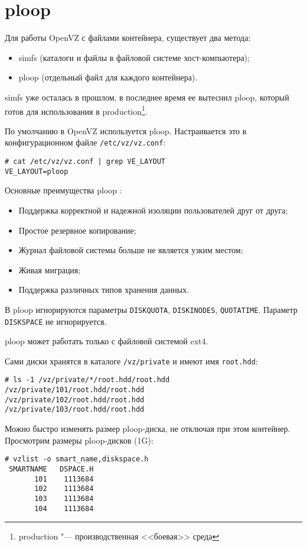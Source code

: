 \section{ploop}

Для работы OpenVZ с файлами контейнера, существует два метода:
\begin{itemize}
    \item simfs (каталоги и файлы в файловой системе хост-компьютера);
    \item ploop (отдельный файл для каждого контейнера).
\end{itemize}

simfs уже осталась в прошлом, в последнее время ее вытеснил ploop, который готов для использования в production\footnote{production "--- производственная <<боевая>> среда}.

По умолчанию в OpenVZ используется ploop.
Настраивается это в конфигурационном файле \texttt{/etc/vz/vz.conf}:
\begin{lstlisting}
# cat /etc/vz/vz.conf | grep VE_LAYOUT
VE_LAYOUT=ploop
\end{lstlisting}

Основные преимущества ploop \cite{ploop}:
\begin{itemize}
    \item Поддержка корректной и надежной изоляции пользователей друг от друга;
    \item Простое резервное копирование;
    \item Журнал файловой системы больше не является узким местом;
    \item Живая миграция;
    \item Поддержка различных типов хранения данных.
\end{itemize}

В ploop игнорируются параметры \texttt{DISKQUOTA}, \texttt{DISKINODES}, \texttt{QUOTATIME}.
Параметр \texttt{DISKSPACE} не игнорируется.

ploop может работать только с файловой системой ext4.

Сами диски хранятся в каталоге \texttt{/vz/private} и имеют имя \texttt{root.hdd}:
\begin{lstlisting}
# ls -1 /vz/private/*/root.hdd/root.hdd
/vz/private/101/root.hdd/root.hdd
/vz/private/102/root.hdd/root.hdd
/vz/private/103/root.hdd/root.hdd
\end{lstlisting}

Можно быстро изменять размер ploop-диска, не отключая при этом контейнер.
Просмотрим размеры ploop-дисков (1G):
\begin{lstlisting}
# vzlist -o smart_name,diskspace.h
 SMARTNAME   DSPACE.H
       101    1113684
       102    1113684
       103    1113684
       104    1113684
\end{lstlisting} 

